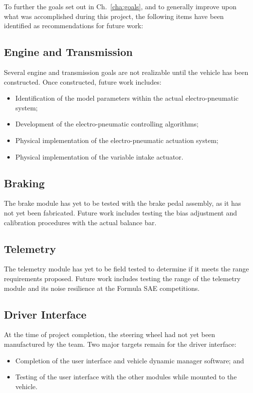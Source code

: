 To further the goals set out in Ch.\ \ref{cha:goals}, and to generally improve upon what was accomplished during this project, the following items have been identified as recommendations for future work:

\subsection{Engine and Transmission}

Several engine and transmission goals are not realizable until the vehicle has been constructed. Once constructed, future work includes:

\begin{itemize}
  \item Identification of the model parameters within the actual electro-pneumatic system;
  \item Development of the electro-pneumatic controlling algorithms;
  \item Physical implementation of the electro-pneumatic actuation system;
  \item Physical implementation of the variable intake actuator.
\end{itemize}

\subsection{Braking}

The brake module has yet to be tested with the brake pedal assembly, as it has not yet been fabricated. Future work includes testing the bias adjustment and calibration procedures with the actual balance bar.

\subsection{Telemetry}

The telemetry module has yet to be field tested to determine if it meets the range requirements proposed. Future work includes testing the range of the telemetry module and its noise resilience at the Formula SAE competitions.

\subsection{Driver Interface}

At the time of project completion, the steering wheel had not yet been manufactured by the team. Two major targets remain for the driver interface:

\begin{itemize}
	\item Completion of the user interface and vehicle dynamic manager software; and
	\item Testing of the user interface with the other modules while mounted to the vehicle.
\end{itemize}
